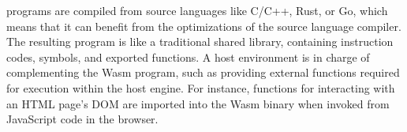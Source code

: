 

\Wasm programs are compiled from source languages like C/C++, Rust, or Go, which means that it can benefit from the optimizations of the source language compiler.
The resulting \Wasm program is like a traditional shared library, containing instruction codes, symbols, and exported functions. 
A host environment is in charge of complementing the Wasm program, such as providing external functions required for execution within the host engine. 
For instance, functions for interacting with an HTML page's DOM are imported into the Wasm binary when invoked from JavaScript code in the browser. 


\begin{minipage}[h]{0.9\textwidth}
    \begin{minipage}[t]{1.0\linewidth}
    
    \end{minipage}
\end{minipage}


